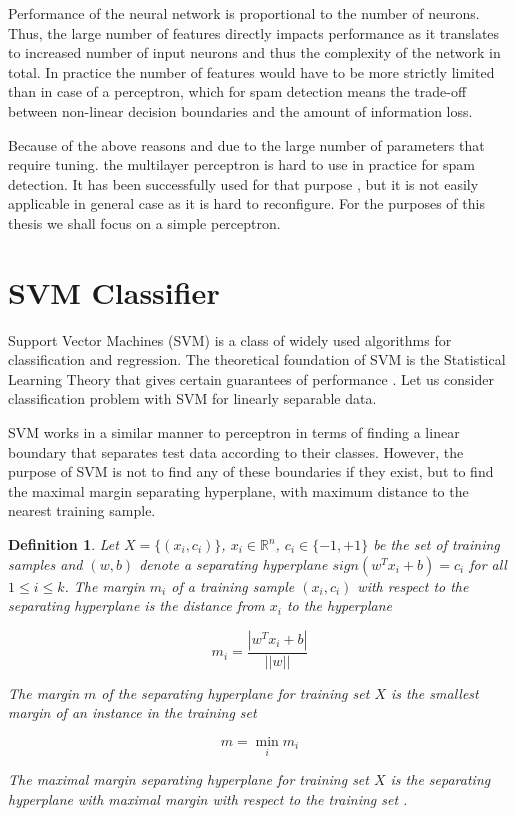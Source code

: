 \documentclass[12pt]{report}
\newcommand{\re}{\mathbb{R}}
\newtheorem{definition}{Definition}[section]
\begin{document}
Performance of the neural network is proportional to the number of neurons. Thus, the large number of features directly impacts performance as it translates to increased number of input neurons and thus the complexity of the network in total. In practice the number of features would have to be more strictly limited than in case of a perceptron, which for spam detection means the trade-off between non-linear decision boundaries and the amount of information loss.

Because of the above reasons and due to the large number of parameters that require tuning. the multilayer perceptron is hard to use in practice for spam detection. It has been successfully used for that purpose \cite{Tretyakov}, but it is not easily applicable in general case as it is hard to reconfigure. For the purposes of this thesis we shall focus on a simple perceptron.

\newpage

\section{SVM Classifier}

Support Vector Machines (SVM) is a class of widely used algorithms for classification and regression. The theoretical foundation of SVM is the Statistical Learning Theory that gives certain guarantees of performance \cite{Cristianini}. Let us consider classification problem with SVM for linearly separable data.

SVM works in a similar manner to perceptron in terms of finding a linear boundary that separates test data according to their classes. However, the purpose of SVM is not to find any of these boundaries if they exist, but to find the maximal margin separating hyperplane, with maximum distance to the nearest training sample.

\begin{definition}
	Let $X = \{(x_i, c_i)\}$, $x_i \in \re^n$, $c_i \in \{-1, +1\}$ be the set of training samples and $(w, b)$ denote a separating hyperplane $sign(w^T x_i + b) = c_i$ for all $1 \leq i \leq k$. The margin $m_i$ of a training sample $(x_i, c_i)$ with respect to the separating hyperplane is the distance from $x_i$ to the hyperplane
	
	$$m_i = \dfrac{|w^T x_i + b|}{||w||}$$
	
	The margin $m$ of the separating hyperplane for training set $X$ is the smallest margin of an instance in the training set
	
	$$m = \min_i m_i$$
	
	The maximal margin separating hyperplane for training set $X$ is the separating hyperplane with maximal margin with respect to the training set \cite{Tretyakov}.
\end{definition}
\end{document}
